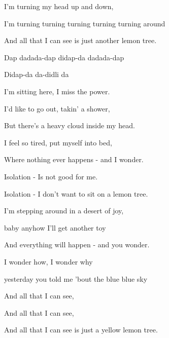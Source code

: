 \begin{song}
\begin{chorusbox}{\Chorus}
I'm turning my head up and down, \par
I'm turning turning turning turning turning around \par
And all that I can see is just another lemon tree.  \par
\end{chorusbox}

\bigskip

Dap  dadada-dap didap-da dadada-dap \par
{}Didap-da  da-didli da   \par

\bigskip

I'm sitting here, I miss the power. \par
I'd like to go out, takin' a shower, \par
But there's a heavy cloud inside my head. \par
I feel so tired, put myself into bed, \par
Where nothing ever happens -  and I wonder.   \par

\bigskip

 Isolation - Is not good for me. \par
{} Isolation - I don't want to  sit on a lemon tree. \par

\bigskip

I'm stepping around in a desert of joy, \par
{}baby anyhow I'll get another toy \par
And everything will happen -  and you wonder.   \par

\bigskip

\Chorus

\bigskip

I wonder how, I wonder why \par
{}yesterday you told me 'bout the blue blue sky \par
And all that I can see, \par
And all that I can see, \par
And all that I can see is just a yellow lemon tree. \par

\end{song}
